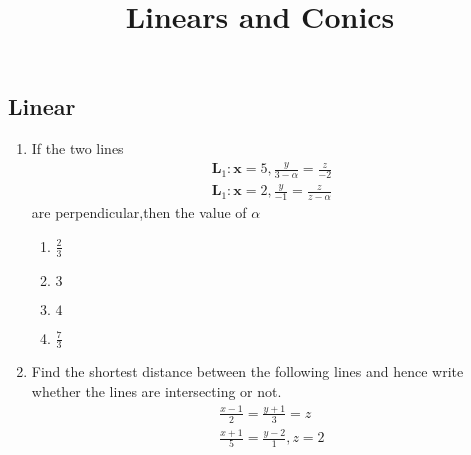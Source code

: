 \documentclass{article}
\let\vec\mathbf{}
\begin{document}
\begin{center}
\title{ Linears and Conics}
\date{}
\maketitle
\section{Linear}     
\end{center}
\begin{enumerate}
    \item If the two lines
    \begin{align}
          \vec{L}_1 : \vec{x}=5,\frac{y}{3-\alpha}=\frac{z}{-2}\\
        \vec{L}_1 : \vec{x}=2,\frac{y}{-1}=\frac{z}{z-\alpha} 
       \end{align}
  are perpendicular,then the value of $\alpha$ \\
        \begin{enumerate}
        \item $\frac{2}{3}$
        \item $3$
        \item $4$
        \item $\frac{7}{3}$
    \end{enumerate}

    \item Find the shortest distance between the following lines and hence write
whether the lines are intersecting or not.\\
\begin{align}
    \frac{x-1}{2} = \frac{y+1}{3} = z \\
    \frac{x+1}{5}=\frac{y-2}{1},z=2
\end{align}


\end{enumerate}
\end{document}
